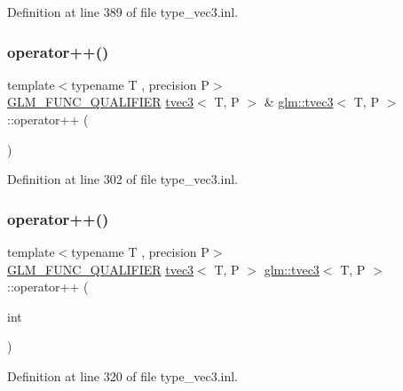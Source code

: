 Definition at line 389 of file type\+\_\+vec3.\+inl.

\mbox{\label{structglm_1_1tvec3_ac7d121d0cd2f4f53227be86b4c08289f}} 
\subsubsection{\texorpdfstring{operator++()}{operator++()}\hspace{0.1cm}{\footnotesize\ttfamily [1/2]}}
{\footnotesize\ttfamily template$<$typename T , precision P$>$ \\
\mbox{\hyperlink{setup_8hpp_a33fdea6f91c5f834105f7415e2a64407}{G\+L\+M\+\_\+\+F\+U\+N\+C\+\_\+\+Q\+U\+A\+L\+I\+F\+I\+ER}} \mbox{\hyperlink{structglm_1_1tvec3}{tvec3}}$<$ T, P $>$ \& \mbox{\hyperlink{structglm_1_1tvec3}{glm\+::tvec3}}$<$ T, P $>$\+::operator++ (\begin{DoxyParamCaption}{ }\end{DoxyParamCaption})}



Definition at line 302 of file type\+\_\+vec3.\+inl.

\mbox{\label{structglm_1_1tvec3_ab316ac7b6ea57d038e304dc43b9f3490}} 
\subsubsection{\texorpdfstring{operator++()}{operator++()}\hspace{0.1cm}{\footnotesize\ttfamily [2/2]}}
{\footnotesize\ttfamily template$<$typename T , precision P$>$ \\
\mbox{\hyperlink{setup_8hpp_a33fdea6f91c5f834105f7415e2a64407}{G\+L\+M\+\_\+\+F\+U\+N\+C\+\_\+\+Q\+U\+A\+L\+I\+F\+I\+ER}} \mbox{\hyperlink{structglm_1_1tvec3}{tvec3}}$<$ T, P $>$ \mbox{\hyperlink{structglm_1_1tvec3}{glm\+::tvec3}}$<$ T, P $>$\+::operator++ (\begin{DoxyParamCaption}\item[{int}]{ }\end{DoxyParamCaption})}



Definition at line 320 of file type\+\_\+vec3.\+inl.

